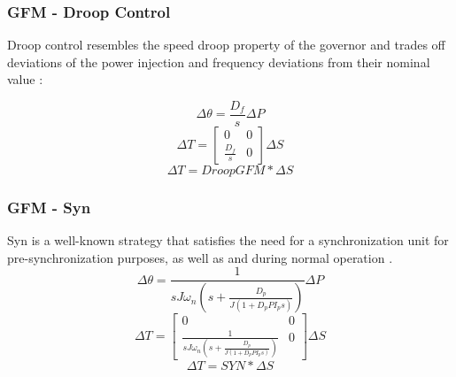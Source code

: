 \subsubsection{GFM - Droop Control}


Droop control resembles the speed droop property of
the governor and trades off deviations of the power
injection and frequency deviations from their nominal value \cite{comparison}:



\begin{equation}
\Delta \theta=\frac{D_f}{s}\Delta P
\end{equation}
\begin{equation}
 \Delta T=\begin{bmatrix}0 & 0 \\ \frac{D_f}{s} &  0\end{bmatrix}\Delta S   
\end{equation}
\begin{equation}
\Delta T=DroopGFM *\Delta S
\end{equation}

\subsubsection{GFM - Syn}
\gls{Syn} is a well-known strategy that satisfies the
need for a synchronization unit for pre-synchronization
purposes, as well as and during normal operation \cite{comparison2}.
\begin{equation}
\Delta \theta=\frac{1}{sJ\omega_n(s+\frac{D_p}{J(1+D_pPI_ps)})}\Delta P
\end{equation}
\begin{equation}
 \Delta T=\begin{bmatrix}0 & 0 \\ \frac{1}{sJ\omega_n(s+\frac{D_p}{J(1+D_pPI_ps)})} &  0\end{bmatrix}\Delta S   
\end{equation}
\begin{equation}
\Delta T=SYN *\Delta S
\end{equation}
